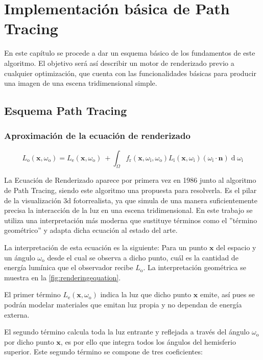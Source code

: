 \chapter{Implementación básica de Path Tracing}
	
En este capítulo se procede a dar un esquema básico de los fundamentos de este algoritmo. El objetivo será así describir un motor de renderizado previo a cualquier optimización, que cuenta con las funcionalidades básicas para producir una imagen de una escena tridimensional simple.


\section{Esquema Path Tracing}
\label{pathtracingexplanation}


	\subsection{Aproximación de la ecuación de renderizado}
\[
{\displaystyle L_{\text{o}}(\mathbf {x} ,\omega _{\text{o}})=L_{\text{e}}(\mathbf {x} ,\omega _{\text{o}})\ +\int _{\Omega }f_{\text{r}}(\mathbf {x} ,\omega _{\text{i}},\omega _{\text{o}})L_{\text{i}}(\mathbf {x} ,\omega _{\text{i}})(\omega _{\text{i}}\cdot \mathbf {n} )\operatorname {d} \omega _{\text{i}}}
\]

La Ecuación de Renderizado \cite{kajiya1986rendering} aparece por primera vez en 1986 junto al algoritmo de Path Tracing, siendo este algoritmo una propuesta para resolverla. Es el pilar de la visualización 3d fotorrealista, ya que simula de una manera suficientemente precisa la interacción de la luz en una escena tridimensional. En este trabajo se utiliza una interpretación más moderna que sustituye términos como el ''término geométrico'' y adapta dicha ecuación al estado del arte.

La interpretación de esta ecuación es la siguiente: Para un punto $\mathbf {x}$ del espacio y un ángulo $\omega _{\text{o}}$ desde el cual se observa a dicho punto, cuál es la cantidad de energía lumínica que el observador recibe $L_{\text{o}}$. La interpretación geométrica se muestra en la \autoref{fig:renderingequation}.

El primer término $L_{\text{e}}(\mathbf {x} ,\omega _{\text{o}})$ indica la luz que dicho punto $\mathbf {x}$ emite, así pues se podrán modelar materiales que emitan luz propia y no dependan de energía externa.

El segundo término calcula toda la luz entrante y reflejada a través del ángulo $\omega _{\text{o}}$ por dicho punto $\mathbf {x}$, es por ello que integra todos los ángulos del hemisferio superior. Este segundo término se compone de tres coeficientes:


